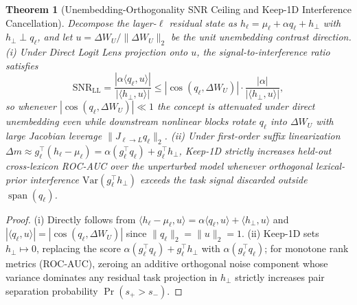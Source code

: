 \documentclass[10pt,twocolumn]{article}
\newtheorem{theorem}{Theorem}
\begin{document}
\begin{theorem}[Unembedding-Orthogonality SNR Ceiling and Keep-1D Interference Cancellation]
Decompose the layer-$\ell$ residual state as $h_\ell = \mu_\ell + \alpha q_\ell + h_\perp$ with $h_\perp \perp q_\ell$, and let $u = \Delta W_U / \|\Delta W_U\|_2$ be the unit unembedding contrast direction.
(i) Under Direct Logit Lens projection onto $u$, the signal-to-interference ratio satisfies
\begin{equation}
  \mathrm{SNR}_{\mathrm{LL}} = \frac{|\alpha \langle q_\ell, u\rangle|}{|\langle h_\perp, u\rangle|} \le |\cos(q_\ell, \Delta W_U)| \cdot \frac{|\alpha|}{|\langle h_\perp, u\rangle|},
\end{equation}
so whenever $|\cos(q_\ell, \Delta W_U)| \ll 1$ the concept is attenuated under direct unembedding even while downstream nonlinear blocks rotate $q_\ell$ into $\Delta W_U$ with large Jacobian leverage $\|J_{\ell \to L} q_\ell\|_2$.
(ii) Under first-order suffix linearization $\Delta m \approx g_\ell^\top (h_\ell - \mu_\ell) = \alpha(g_\ell^\top q_\ell) + g_\ell^\top h_\perp$, Keep-1D strictly increases held-out cross-lexicon ROC-AUC over the unperturbed model whenever orthogonal lexical-prior interference $\mathrm{Var}(g_\ell^\top h_\perp)$ exceeds the task signal discarded outside $\operatorname{span}(q_\ell)$.
\end{theorem}
\begin{proof}
(i) Directly follows from $\langle h_\ell - \mu_\ell, u\rangle = \alpha \langle q_\ell, u\rangle + \langle h_\perp, u\rangle$ and $|\langle q_\ell, u\rangle| = |\cos(q_\ell, \Delta W_U)|$ since $\|q_\ell\|_2 = \|u\|_2 = 1$.
(ii) Keep-1D sets $h_\perp \mapsto 0$, replacing the score $\alpha(g_\ell^\top q_\ell) + g_\ell^\top h_\perp$ with $\alpha(g_\ell^\top q_\ell)$; for monotone rank metrics (ROC-AUC), zeroing an additive orthogonal noise component whose variance dominates any residual task projection in $h_\perp$ strictly increases pair separation probability $\Pr(s_+ > s_-)$.
\end{proof}
\end{document}
